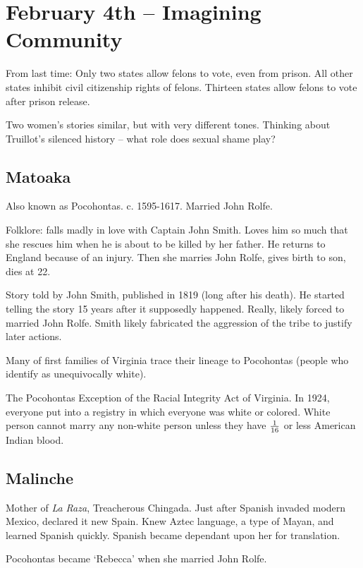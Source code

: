 \section{February 4th -- Imagining Community}

From last time: Only two states allow felons to vote, even from prison. All other states inhibit civil citizenship rights of felons. Thirteen states allow felons to vote after prison release.

Two women's stories similar, but with very different tones. Thinking about Truillot's silenced history -- what role does sexual shame play?

\subsection{Matoaka}

Also known as Pocohontas. c. 1595-1617. Married John Rolfe.

Folklore: falls madly in love with Captain John Smith. Loves him so much that she rescues him when he is about to be killed by her father. He returns to England because of an injury. Then she marries John Rolfe, gives birth to son, dies at 22.

Story told by John Smith, published in 1819 (long after his death). He started telling the story 15 years after it supposedly happened. Really, likely forced to married John Rolfe. Smith likely fabricated the aggression of the tribe to justify later actions.

Many of first families of Virginia trace their lineage to Pocohontas (people who identify as unequivocally white).

The Pocohontas Exception of the Racial Integrity Act of Virginia. In 1924, everyone put into a registry in which everyone was white or colored. White person cannot marry any non-white person unless they have $1\over16$ or less American Indian blood.

\subsection{Malinche}

Mother of \textit{La Raza}, Treacherous Chingada. Just after Spanish invaded modern Mexico, declared it new Spain. Knew Aztec language, a type of Mayan, and learned Spanish quickly. Spanish became dependant upon her for translation.

Pocohontas became `Rebecca' when she married John Rolfe. 

